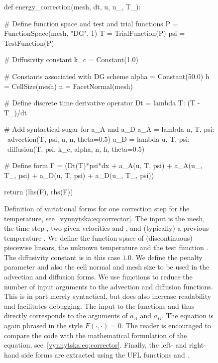 \begin{figure}
  \begin{center}
    \begin{python}
def energy_correction(mesh, dt, u, u_, T_):

    # Define function space and test and trial functions
    P = FunctionSpace(mesh, "DG", 1)
    T = TrialFunction(P)
    psi = TestFunction(P)

    # Diffusivity constant
    k_c = Constant(1.0)

    # Constants associated with DG scheme
    alpha = Constant(50.0)
    h = CellSize(mesh)
    n = FacetNormal(mesh)

    # Define discrete time derivative operator
    Dt = lambda T: (T - T_)/dt

    # Add syntactical sugar for a_A and a_D
    a_A = lambda u, T, psi: \
              advection(T, psi, u, n, theta=0.5)
    a_D = lambda u, T, psi: \
              diffusion(T, psi, k_c, alpha,
                        n, h, theta=0.5)

    # Define form
    F = (Dt(T)*psi*dx
         + a_A(u, T, psi) + a_A(u_, T_, psi)
         + a_D(u, T, psi) + a_D(u_, T_, psi))

    return (lhs(F), rhs(F))
    \end{python}
    \end{center}
    \caption{Definition of variational forms for one correction step
      for the temperature, see~\eqref{vynnytska:eq:corrector}. The
      input is the mesh, the time step \emp{dt}, two given velocities
      \emp{u} and \emp{u\_}, and (typically) a previous temperature
      \emp{T\_}. We define the function space of (discontinuous)
      piecewise linears, the unknown temperature \emp{T} and the test
      function \emp{psi}. The diffusivity constant \emp{k\_c} is in
      this case $1.0$. We define the penalty parameter \emp{alpha}
      and also the cell normal \emp{n} and mesh size \emp{h} to be
      used in the advection and diffusion forms.
%
      We use  functions to reduce the number of input
      arguments to the advection and diffusion functions. This is in
      part merely syntactical, but does also increase readability and
      facilitates debugging. The input to the functions \emp{a\_A}
      and \emp{a\_D} thus directly corresponds to the arguments of
      $a_A$ and $a_D$.
%
      The equation is again phrased in the style $F(\cdot, \cdot) =
      0$. The reader is encouraged to compare the code with the
      mathematical formulation of the equation,
      see~\eqref{vynnytska:eq:corrector}. Finally, the left- and
      right-hand side forms are extracted using the UFL
      functions \emp{lhs} and \emp{rhs}.}
  \label{vynnytska:fig:temperaturecorrection}
\end{figure}

